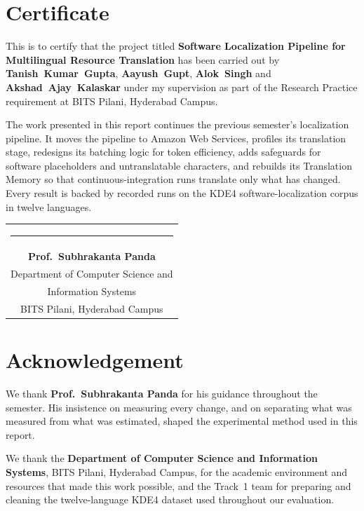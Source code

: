 \documentclass[11pt,a4paper]{article}
\newcommand{\reporttitle}{Software Localization Pipeline for Multilingual Resource Translation}
\begin{document}

\section*{Certificate}
{\sloppy This is to certify that the project titled \textbf{\reporttitle} has been carried out by
\mbox{\textbf{Tanish Kumar Gupta}}, \mbox{\textbf{Aayush Gupt}}, \mbox{\textbf{Alok Singh}} and \mbox{\textbf{Akshad Ajay Kalaskar}} under my supervision as part of the
Research Practice requirement at BITS Pilani, Hyderabad Campus.\par}

The work presented in this report continues the previous semester's localization pipeline. It moves the pipeline to
Amazon Web Services, profiles its translation stage, redesigns its batching logic for token efficiency, adds safeguards
for software placeholders and untranslatable characters, and rebuilds its Translation Memory so that continuous-integration
runs translate only what has changed. Every result is backed by recorded runs on the KDE4 software-localization corpus in
twelve languages.

\vspace{2.5cm}
\hfill\begin{tabular}{c}
\rule{6.5cm}{0.4pt}\\
\textbf{Prof.\ Subhrakanta Panda}\\
Department of Computer Science and\\
Information Systems\\
BITS Pilani, Hyderabad Campus
\end{tabular}
\clearpage

\section*{Acknowledgement}
We thank \textbf{Prof.\ Subhrakanta Panda} for his guidance throughout the semester. His insistence on measuring every
change, and on separating what was measured from what was estimated, shaped the experimental method used in this report.

We thank the \textbf{Department of Computer Science and Information Systems}, BITS Pilani, Hyderabad Campus, for the
academic environment and resources that made this work possible, and the Track~1 team for preparing and cleaning the
twelve-language KDE4 dataset used throughout our evaluation.
\end{document}
